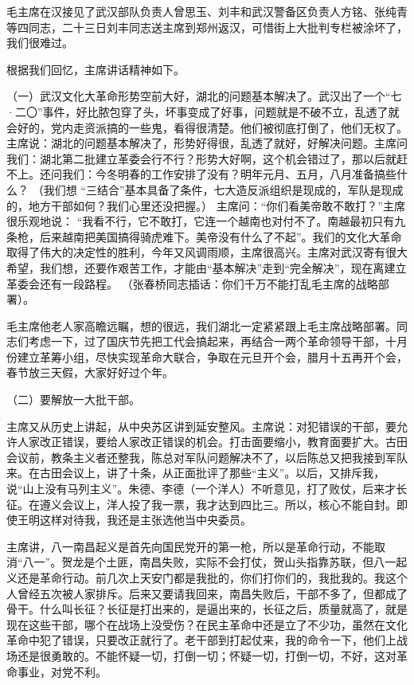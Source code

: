 毛主席在汉接见了武汉部队负责人曾思玉、刘丰和武汉警备区负责人方铭、张纯青等四同志，二十三日刘丰同志送主席到郑州返汉，可惜街上大批判专栏被涂坏了，我们很难过。

根据我们回忆，主席讲话精神如下。

（一）武汉文化大革命形势空前大好，湖北的问题基本解决了。武汉出了一个“七·二〇”事件，好比脓包穿了头，坏事变成了好事，问题就是不破不立，乱透了就会好的，党内走资派搞的一些鬼，看得很清楚。他们被彻底打倒了，他们无权了。主席说：湖北的问题基本解决了，形势好得很，乱透了就好，好解决问题。主席问我们：湖北第二批建立革委会行不行？形势大好啊，这个机会错过了，那以后就赶不上。还问我们：今冬明春的工作安排了没有？明年元月、五月，八月准备搞些什么？  （我们想 “三结合”基本具备了条件，七大造反派组织是现成的，军队是现成的，地方干部如何？我们心里还没把握。） 主席问：“你们看美帝敢不敢打？”主席很乐观地说： “我看不行，它不敢打，它连一个越南也对付不了。南越最初只有九条枪，后来越南把美国搞得骑虎难下。美帝没有什么了不起”。我们的文化大革命取得了伟大的决定性的胜利，今年又风调雨顺，主席很高兴。主席对武汉寄有很大希望，我们想，还要作艰苦工作，才能由“基本解决”走到“完全解决”，现在离建立革委会还有一段路程。  （张春桥同志插话：你们千万不能打乱毛主席的战略部署）。

毛主席他老人家高瞻远瞩，想的很远，我们湖北一定紧紧跟上毛主席战略部署。同志们考虑一下，过了国庆节先把工代会搞起来，再结合一两个革命领导干部，十月份建立革筹小组，尽快实现革命大联合，争取在元旦开个会，腊月十五再开个会，春节放三天假，大家好好过个年。

（二）要解放一大批干部。

主席又从历史上讲起，从中央苏区讲到延安整风。主席说：对犯错误的干部，要允许人家改正错误，要给人家改正错误的机会。打击面要缩小，教育面要扩大。古田会议前，教条主义者还整我，陈总对军队问题解决不了，以后陈总又把我接到军队来。在古田会议上，讲了十条，从正面批评了那些“主义”。以后，又排斥我，说“山上没有马列主义”。朱德、李德（一个洋人）不听意见，打了败仗，后来才长征。在遵义会议上，洋人投了我一票，我才达到四比三。所以，核心不能自封。即使王明这样对待我，我还是主张选他当中央委员。

主席讲，八一南昌起义是首先向国民党开的第一枪，所以是革命行动，不能取消“八一”。贺龙是个土匪，南昌失败，实际不会打仗，贺山头指靠苏联，但八一起义还是革命行动。前几次上天安门都是我批的，你们打你们的，我批我的。我这个人曾经五次被人家排斥。后来又要请我回来，南昌失败后，干部不多了，但都成了骨干。什么叫长征？长征是打出来的，是逼出来的，长征之后，质量就高了，就是现在这些干部，哪个在战场上没受伤？在民主革命中还是立了不少功，虽然在文化革命中犯了错误，只要改正就行了。老干部到打起仗来，我的命令一下，他们上战场还是很勇敢的。不能怀疑一切，打倒一切；怀疑一切，打倒一切，不好，这对革命事业，对党不利。

